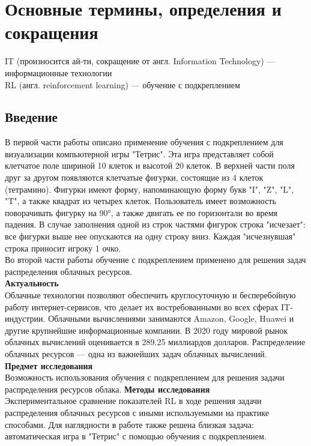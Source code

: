 \documentclass{article}
\begin{document}
\section {Основные термины, определения и сокращения}
IT (произносится ай-ти, сокращение от англ. Information Technology) — информационные технологии\\
RL (англ. reinforcement learning) — обучение с подкреплением\\
\newpage
\begin{center}
\section {Введение}
\end{center}
В первой части работы описано применение обучения с подкреплением для визуализации компьютерной игры "Тетрис"\cite{litlink8}. Эта игра представляет собой клетчатое поле шириной 10 клеток и высотой 20 клеток. В верхней части поля друг за другом появляются клетчатые фигурки, состоящие из 4 клеток (тетрамино). Фигурки имеют форму, напоминающую форму букв "I", "Z", "L", "T", а также квадрат из четырех клеток. Пользователь имеет возможность поворачивать фигурку на 90°, а также двигать ее по горизонтали во время падения. В случае заполнения одной из строк частями фигурок строка "исчезает": все фигурки выше нее опускаются на одну строку вниз. Каждая "исчезнувшая" строка приносит игроку 1 очко.\\
Во второй части работы обучение с подкреплением применено для решения задач распределения облачных ресурсов.\\
\textbf{Актуальность}\\
Облачные технологии позволяют обеспечить круглосуточную и бесперебойную работу интернет-сервисов, что делает их востребованными во всех сферах IT-индустрии. Облачными вычислениями занимаются Amazon, Google, Huawei и другие крупнейшие информационные компании\cite{litlink2}\cite{litlink12}. В 2020 году мировой рынок облачных вычислений оценивается в 289.25 миллиардов долларов\cite{litlink11}. Распределение облачных ресурсов — одна из важнейших задач облачных вычислений.\\
\textbf{Предмет исследования}\\
Возможность использования обучения с подкреплением для решения задачи распределения ресурсов облака.
\textbf{Методы исследования}\\
Экспериментальное сравнение показателей RL в ходе решения задачи распределения облачных ресурсов с иными используемыми на практике способами. Для наглядности в работе также решена близкая задача: автоматическая игра в "Тетрис" с помощью обучения с подкреплением.\\
\end{document}
